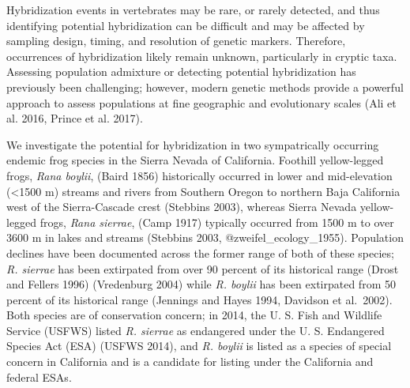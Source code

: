 \documentclass[twoside,12pt,final]{ucthesis-CA2012}
\begin{document}
\begin{ucmainmatter}
Hybridization events in vertebrates may be rare, or rarely detected, and
thus identifying potential hybridization can be difficult and may be
affected by sampling design, timing, and resolution of genetic markers.
Therefore, occurrences of hybridization likely remain unknown,
particularly in cryptic taxa. Assessing population admixture or
detecting potential hybridization has previously been challenging;
however, modern genetic methods provide a powerful approach to assess
populations at fine geographic and evolutionary scales (Ali et al. 2016,
Prince et al. 2017).

We investigate the potential for hybridization in two sympatrically
occurring endemic frog species in the Sierra Nevada of California.
Foothill yellow-legged frogs, \emph{Rana boylii}, (Baird 1856)
historically occurred in lower and mid-elevation (\textless{}1500 m)
streams and rivers from Southern Oregon to northern Baja California west
of the Sierra-Cascade crest (Stebbins 2003), whereas Sierra Nevada
yellow-legged frogs, \emph{Rana sierrae}, (Camp 1917) typically occurred
from 1500 m to over 3600 m in lakes and streams (Stebbins 2003,
@zweifel\_ecology\_1955). Population declines have been documented
across the former range of both of these species; \emph{R. sierrae} has
been extirpated from over 90 percent of its historical range (Drost and
Fellers 1996) (Vredenburg 2004) while \emph{R. boylii} has been
extirpated from 50 percent of its historical range (Jennings and Hayes
1994, Davidson et al.~2002). Both species are of conservation concern;
in 2014, the U. S. Fish and Wildlife Service (USFWS) listed \emph{R.
sierrae} as endangered under the U. S. Endangered Species Act (ESA)
(USFWS 2014), and \emph{R. boylii} is listed as a species of special
concern in California and is a candidate for listing under the
California and federal ESAs.


\end{ucmainmatter}
\end{document}
